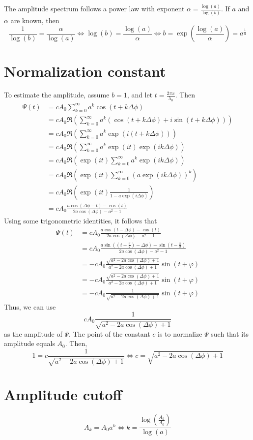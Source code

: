 \documentclass[a4paper, 12pt]{scrartcl}
\begin{document}
The amplitude spectrum follows a power law with exponent $\alpha = \frac{\log(a)}{\log(b)}$. If $a$ and $\alpha$ are known, then
\[
 \frac{1}{\log(b)} = \frac{\alpha}{\log(a)} \Leftrightarrow
 \log(b) = \frac{\log(a)}{\alpha}\Leftrightarrow
 b = \exp\left(\frac{\log(a)}{\alpha}\right) = a^{\frac{1}{\alpha}}
\]


\section{Normalization constant}
To estimate the amplitude, assume $b = 1$, and let $t = \frac{2\pi x}{\lambda_0}$. Then
\[
\begin{aligned}
 \Psi(t) &= c A_0\sum_{k=0}^\infty a^k\cos\left(t + k\Delta \phi\right)\\
	&= cA_0\Re\left( \sum_{k=0}^\infty a^k \left(\cos\left(t + k\Delta \phi\right) + i \sin\left(t + k\Delta \phi\right)\right)\right)\\
	&= cA_0\Re\left( \sum_{k=0}^\infty a^k \exp\left(i\left(t + k\Delta\phi\right)\right)\right)\\
	&= cA_0\Re\left( \sum_{k=0}^\infty a^k \exp\left(i t\right)\exp\left(i k\Delta\phi\right)\right)\\
	&= cA_0\Re\left(\exp\left(i t\right) \sum_{k=0}^\infty a^k \exp\left(i k\Delta\phi\right)\right)\\
	&= cA_0\Re\left(\exp\left(i t\right) \sum_{k=0}^\infty \left(a \exp\left(i k\Delta\phi\right)\right)^k\right)\\
	&= cA_0\Re\left(\exp\left(i t\right) \frac{1}{1 - a\exp\left(i\Delta\phi\right)}\right)\\
	&= cA_0\frac{a\cos\left(\Delta\phi - t\right) - \cos(t)}
		{2a\cos\left( \Delta\phi \right) -a^{2}-1}
 \end{aligned}
\]
Using some trigonometric identities, it follows that
\[
\begin{aligned}
 \Psi(t) &= cA_0\frac{a \cos{\left( t - \Delta\phi\right) }-\cos(t)}{2 a \cos\left( \Delta\phi \right) - a^2-1} \\
 &= cA_0\frac{a \sin\left( \left(t - \frac{\pi}{2}\right) - \Delta\phi\right)-\sin\left(t - \frac{\pi}{2}\right)}{2 a \cos\left( \Delta\phi \right) - a^2-1}\\
 &= -cA_0\frac{\sqrt{a^2 - 2a\cos\left(\Delta\phi\right) + 1}}
 {a^2 - 2 a \cos\left(\Delta\phi \right) + 1}\sin(t + \varphi) \\
 &= -cA_0\frac{\sqrt{a^2 - 2a\cos\left(\Delta\phi\right) + 1}}
 {a^2 - 2 a \cos\left(\Delta\phi \right) + 1}\sin(t + \varphi) \\
  &= -cA_0\frac{1}{\sqrt{a^2 - 2a\cos\left(\Delta\phi\right) + 1}}\sin(t + \varphi)
\end{aligned}
\]
Thus, we can use
\[
 cA_0\frac{1}{\sqrt{a^2 - 2a\cos\left(\Delta\phi\right) + 1}}
\]
as the amplitude of $\Psi$. The point of the constant $c$ is to normalize $\Psi$ such that its amplitude equals $A_0$. Then,
\[
 1 = c\frac{1}{\sqrt{a^2 - 2a\cos\left(\Delta\phi\right) + 1}} \Leftrightarrow c = \sqrt{a^2 - 2a\cos\left(\Delta\phi\right) + 1}
\]


\section{Amplitude cutoff}
\[
 	A_k = A_0 a^k\Leftrightarrow k = \frac{\log\left(\frac{A_k}{A_0}\right)}{\log(a)}
\]
\end{document}
